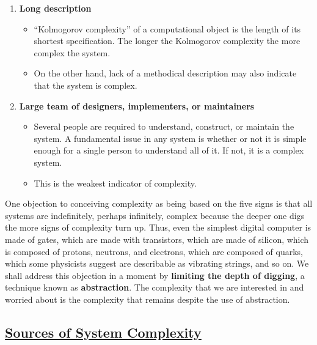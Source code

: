 \documentclass{article}
\begin{document}
\begin{enumerate}
\begin{itemize}
        understanding.
    \end{itemize}
    \item \textbf{Long description}
    \begin{itemize}
        \item “Kolmogorov complexity” of a computational object is the length of its shortest specification. The longer the Kolmogorov complexity the more complex the system.
        \item On the other hand, lack of a methodical description may also indicate that the system is complex.
    \end{itemize}
    \item \textbf{Large team of designers, implementers, or maintainers}
    \begin{itemize}
        \item Several people are required to understand, construct, or maintain the system. A fundamental issue in any system is whether or not it is simple enough for a single person to understand all of it. If not, it is a complex system.
        \item This is the weakest indicator of complexity.
    \end{itemize}
\end{enumerate}

One objection to conceiving complexity as being based on the five signs is that all systems are indefinitely, perhaps infinitely, complex because the deeper one digs the more signs of complexity turn up. Thus, even the simplest digital computer is made of gates, which are made with transistors, which are made of silicon, which
is composed of protons, neutrons, and electrons, which are composed of quarks, which some physicists suggest are describable as vibrating strings, and so on. We shall address this objection in a moment by \textbf{limiting the depth of digging}, a technique
known as \textbf{abstraction}. The complexity that we are interested in and worried about is the complexity that remains despite the use of abstraction.


\subsection*{\underline{Sources of System Complexity}}
\end{document}
